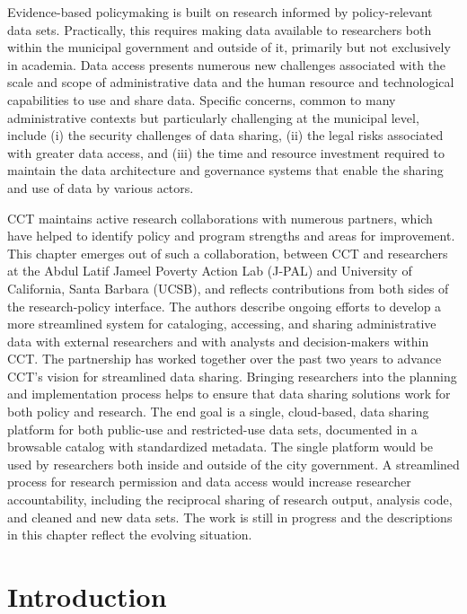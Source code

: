 Evidence-based policymaking is built on research informed by policy-relevant data sets. Practically, this requires making data available to researchers both within the municipal government and outside of it, primarily but not exclusively in academia. Data access presents numerous new challenges associated with the scale and scope of administrative data and the human resource and technological capabilities to use and share data. Specific concerns, common to many administrative contexts but particularly challenging at the municipal level, include (i) the security challenges of data sharing, (ii) the legal risks associated with greater data access, and (iii) the time and resource investment required to maintain the data architecture and governance systems that enable the sharing and use of data by various actors.

CCT maintains active research collaborations with numerous partners, which have helped to identify policy and program strengths and areas for improvement. This chapter emerges out of such a collaboration, between CCT and researchers at the Abdul Latif Jameel Poverty Action Lab (J-PAL) and University of California, Santa Barbara (UCSB), and reflects contributions from both sides of the research-policy interface. The authors describe ongoing efforts to develop a more streamlined system for cataloging, accessing, and sharing administrative data with external researchers and with analysts and decision-makers within CCT. The partnership has worked together over the past two years to advance CCT's vision for streamlined data sharing. Bringing researchers into the planning and implementation process helps to ensure that data sharing solutions work for both policy and research. The end goal is a single, cloud-based, data sharing platform for both public-use and restricted-use data sets, documented in a browsable catalog with standardized metadata. The single platform would be used by researchers both inside and outside of the city government. A streamlined process for research permission and data access would increase researcher accountability, including the reciprocal sharing of research output, analysis code, and cleaned and new data sets. The work is still in progress and the descriptions in this chapter reflect the evolving situation.

\hypertarget{introduction-7}{%
\section{Introduction}\label{introduction-7}}

